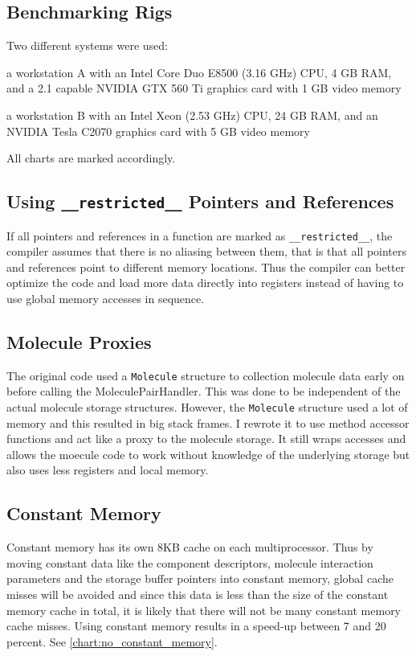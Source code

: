 \subsection{Benchmarking Rigs}
Two different systems were used:
\begin{compactitem}
\item a workstation A with an Intel Core Duo E8500 (\@ 3.16 GHz) CPU, 4 GB RAM, and a \cuda{} 2.1 capable NVIDIA GTX 560 Ti graphics card with 1 GB video memory
\item a workstation B with an Intel Xeon (\@ 2.53 GHz) CPU, 24 GB RAM, and an NVIDIA Tesla C2070 graphics card with 5 GB video memory
\end{compactitem}
All charts are marked accordingly.

\subsection{Using \lstinline!__restricted__! Pointers and References}
If all pointers and references in a function are marked as \lstinline!__restricted__!, the compiler assumes that there is no aliasing between them, that is that all pointers and references point to different memory locations.
Thus the compiler can better optimize the code and load more data directly into registers instead of having to use global memory accesses in sequence.

\subsection{Molecule Proxies}
The original code used a \lstinline!Molecule! structure to collection molecule data early on before calling the MoleculePairHandler. This was done to be independent of the actual molecule storage structures.
However, the \lstinline!Molecule! structure used a lot of memory and this resulted in big stack frames.
I rewrote it to use method accessor functions and act like a proxy to the molecule storage. It still wraps accesses and allows the moecule code to work without knowledge of the underlying storage but also uses less registers and local memory.

\subsection{Constant Memory}
Constant memory has its own 8KB cache on each multiprocessor. Thus by moving constant data like the component descriptors, molecule interaction parameters and the storage buffer pointers into constant memory, global cache misses will be avoided and since this data is less than the size of the constant memory cache in total, it is likely that there will not be many constant memory cache misses.
Using constant memory results in a speed-up between 7 and 20 percent. See  \autoref{chart:no_constant_memory}.


